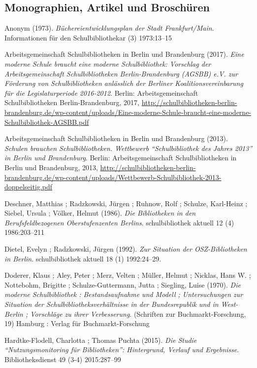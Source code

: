 \documentclass[a4paper,
fontsize=11pt,
oneside,
numbers=noperiodatend,
parskip=half-,
bibliography=totoc,
final
]{scrartcl}
\begin{document}
\subsection{Monographien, Artikel und
Broschüren}\label{monographien-artikel-und-broschuxfcren}

Anonym (1973). \emph{Büchereientwicklungsplan der Stadt Frankfurt/Main}.
Informationen für den Schulbibliothekar (3) 1973:13--15

Arbeitsgemeinschaft Schulbibliotheken in Berlin und Brandenburg (2017).
\emph{Eine moderne Schule braucht eine moderne Schulbibliothek:
Vorschlag der Arbeitsgemeinschaft Schulbibliotheken Berlin-Brandenburg
(AGSBB) e.V. zur Förderung von Schulbibliotheken anlässlich der Berliner
Koalitionsvereinbarung für die Legislaturperiode 2016-2012}. Berlin:
Arbeitsgemeinschaft Schulbibliotheken Berlin-Brandenburg, 2017,
\url{http://schulbibliotheken-berlin-brandenburg.de/wp-content/uploads/Eine-moderne-Schule-braucht-eine-moderne-Schulbibliothek-AGSBB.pdf}

Arbeitsgemeinschaft Schulbibliotheken in Berlin und Brandenburg (2013).
\emph{Schulen brauchen Schulbibliotheken. Wettbewerb
\enquote{Schulbibliothek des Jahres 2013} in Berlin und Brandenburg}.
Berlin: Arbeitsgemeinschaft Schulbibliotheken in Berlin und Brandenburg,
2013,
\url{http://schulbibliotheken-berlin-brandenburg.de/wp-content/uploads/Wettbewerb-Schulbibliothek-2013-doppelseitig.pdf}

Deschner, Matthias ; Radzkowski, Jürgen ; Ruhnow, Rolf ; Schulze,
Karl-Heinz ; Siebel, Ursula ; Völker, Helmut (1986). \emph{Die
Bibliotheken in den Berufsfeldbezogenen Oberstufenzenten Berlins}.
schulbibliothek aktuell 12 (4) 1986:203--211

Dietel, Evelyn ; Radzkowski, Jürgen (1992). \emph{Zur Situation der
OSZ-Bibliotheken in Berlin}. schulbibliothek aktuell 18 (1) 1992:24--29.

Doderer, Klaus ; Aley, Peter ; Merz, Velten ; Müller, Helmut ; Nicklas,
Hans W. ; Nottebohm, Brigitte ; Schulze-Guttermann, Jutta ; Siegling,
Luise (1970). \emph{Die moderne Schulbibliothek : Bestandsaufnahme und
Modell ; Untersuchungen zur Situation der Schulbibliotheksverhältnisse
in der Bundesrepublik und in West-Berlin ; Vorschläge zu ihrer
Verbesserung}. (Schriften zur Buchmarkt-Forschung, 19) Hamburg : Verlag
für Buchmarkt-Forschung

Hardtke-Flodell, Charlotta ; Thomas Puchta (2015). \emph{Die Studie
\enquote{Nutzungsmonitoring für Bibliotheken}: Hintergrund, Verlauf und
Ergebnisse}. Bibliotheksdienst 49 (3-4) 2015:287--99
\end{document}
